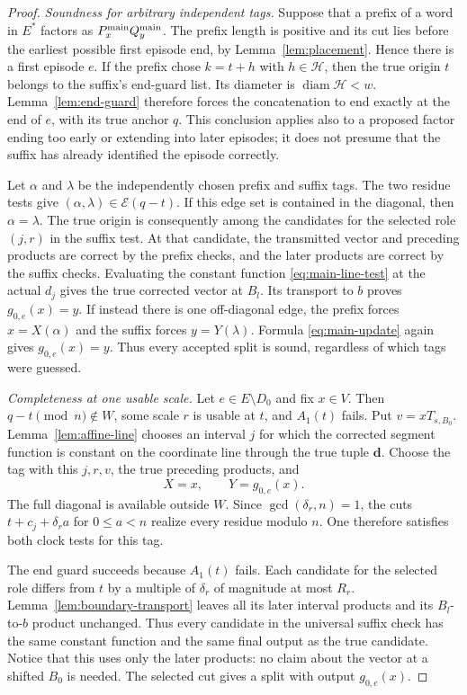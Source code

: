 \begin{proof}
\emph{Soundness for arbitrary independent tags.}
Suppose that a prefix of a word in $E^*$ factors as
$P_x^{\rm main}Q_y^{\rm main}$.  The prefix length is positive and its
cut lies before the earliest possible first episode end, by
Lemma~\ref{lem:placement}.  Hence there is a first episode $e$.
If the prefix chose $k=t+h$ with $h\in\mathcal H$, then the true origin
$t$ belongs to the suffix's end-guard list.  Its diameter is
$\operatorname{diam}\mathcal H<w$.  Lemma~\ref{lem:end-guard} therefore
forces the concatenation to end exactly at the end of $e$, with its true
anchor $q$.  This conclusion applies also to a proposed factor ending
too early or extending into later episodes; it does not presume that the
suffix has already identified the episode correctly.

Let $\alpha$ and $\lambda$ be the independently chosen prefix and suffix
tags.  The two residue tests give
$(\alpha,\lambda)\in\mathcal E(q-t)$.  If this edge set is contained in
the diagonal, then $\alpha=\lambda$.  The true origin is consequently
among the candidates for the selected role $(j,r)$ in the suffix test.
At that candidate, the transmitted vector and preceding products are
correct by the prefix checks, and the later products are correct by the
suffix checks.  Evaluating the constant function
\eqref{eq:main-line-test} at the actual $d_j$ gives the true corrected
vector at $B_l$.  Its transport to $b$ proves $g_{0,e}(x)=y$.
If instead there is one off-diagonal edge, the prefix forces
$x=X(\alpha)$ and the suffix forces $y=Y(\lambda)$.  Formula
\eqref{eq:main-update} again gives $g_{0,e}(x)=y$.  Thus every accepted
split is sound, regardless of which tags were guessed.

\emph{Completeness at one usable scale.}
Let $e\in E\setminus D_0$ and fix $x\in V$.
Then $q-t\pmod n\notin W$, some scale $r$ is usable at $t$, and
$A_1(t)$ fails.  Put $v=xT_{s,B_0}$.  Lemma~\ref{lem:affine-line}
chooses an interval $j$ for which the corrected segment function is
constant on the coordinate line through the true tuple $\mathbf d$.
Choose the tag with this $j,r,v$, the true preceding products, and
\[
 X=x,\qquad Y=g_{0,e}(x).
\]
The full diagonal is available outside $W$.  Since
$\gcd(\delta_r,n)=1$, the cuts $t+c_j+\delta_r a$ for $0\leq a<n$
realize every residue modulo $n$.  One therefore satisfies both clock
tests for this tag.

The end guard succeeds because $A_1(t)$ fails.  Each candidate for the
selected role differs from $t$ by a multiple of $\delta_r$ of magnitude
at most $R_r$.  Lemma~\ref{lem:boundary-transport} leaves all its later
interval products and its $B_l$-to-$b$ product unchanged.  Thus every
candidate in the universal suffix check has the same constant function
and the same final output as the true candidate.  Notice that this uses
only the later products: no claim about the vector at a shifted $B_0$
is needed.  The selected cut gives a split with output $g_{0,e}(x)$.
\end{proof}

